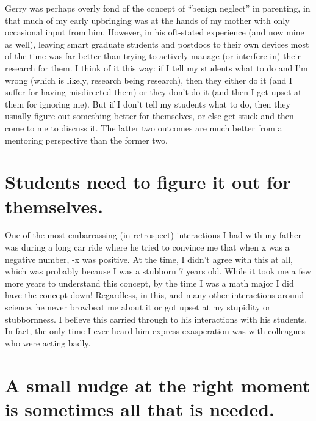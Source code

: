 \documentclass{ws-rv9x6}
\begin{document}
Gerry was perhaps overly fond of the concept of ``benign neglect'' in
parenting, in that much of my early upbringing was at the hands of my
mother with only occasional input from him. However, in his oft-stated
experience (and now mine as well), leaving smart graduate students and
postdocs to their own devices most of the time was far better than
trying to actively manage (or interfere in) their research for them. I
think of it this way: if I tell my students what to do and I'm wrong
(which is likely, research being research), then they either do it
(and I suffer for having misdirected them) or they don't do it (and
then I get upset at them for ignoring me). But if I don't tell my
students what to do, then they usually figure out something better for
themselves, or else get stuck and then come to me to discuss it. The
latter two outcomes are much better from a mentoring perspective than
the former two.

\section*{Students need to figure it out for themselves.}

One of the most embarrassing (in retrospect) interactions I had with
my father was during a long car ride where he tried to convince me
that when x was a negative number, -x was positive. At the time, I
didn't agree with this at all, which was probably because I was a stubborn
7 years old. While it took me a few more years to
understand this concept, by the time I was a math major I did have the
concept down! Regardless, in this, and many other interactions around science,
he never browbeat me about it or got upset at my stupidity or
stubbornness. I believe this carried through to his interactions with
his students. In fact, the only time I ever heard him express
exasperation was with colleagues who were acting badly.

\section*{A small nudge at the right moment is sometimes all that is needed.}
\end{document}
